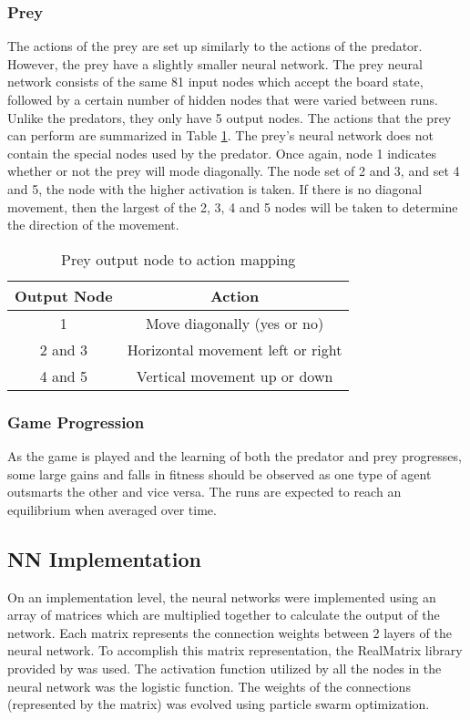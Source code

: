 \subsubsection{Prey}
  The actions of the prey are set up similarly to the actions of the predator. However, the prey have a slightly smaller neural network. The prey neural network consists of the same 81 input nodes which accept the board state, followed by a certain number of hidden nodes that were varied between runs. Unlike the predators, they only have 5 output nodes. The actions that the prey can perform are summarized in Table \ref{tab:prey-actions}. The prey's neural network does not contain the special nodes used by the predator. Once again, node 1 indicates whether or not the prey will mode diagonally. The node set of 2 and 3, and set 4 and 5, the node with the higher activation is taken. If there is no diagonal movement, then the largest of the 2, 3, 4 and 5 nodes will be taken to determine the direction of the movement.

\begin{table}
  \centering
  \begin{tabular}{|c|c|}
    \hline
    Output Node & Action \\
    \hline
    1 & Move diagonally (yes or no)\\
    2 and 3 & Horizontal movement left or right \\
    4 and 5 & Vertical movement up or down \\
    \hline
  \end{tabular}
  \caption{Prey output node to action mapping}
  \label{tab:prey-actions}
\end{table}


	
\subsubsection{Game Progression}
	As the game is played and the learning of both the predator and prey progresses, some large gains and falls in fitness should be observed as one type of agent outsmarts the other and vice versa. The runs are expected to reach an equilibrium when averaged over time. 

\subsection{NN Implementation} 
	On an implementation level, the neural networks were implemented using an array of matrices which are multiplied together to calculate the output of the network. Each matrix represents the connection weights between 2 layers of the neural network. To accomplish this matrix representation, the RealMatrix library provided by \cite{apache} was used. The activation function utilized by all the nodes in the neural network was the logistic function. The weights of the connections (represented by the matrix) was evolved using particle swarm optimization.
	
